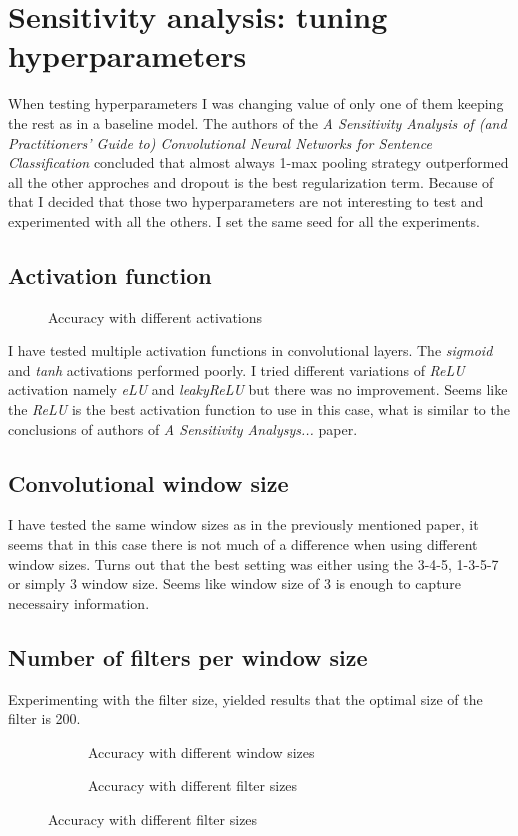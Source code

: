 \documentclass{article}
\begin{document}
\section{Sensitivity analysis: tuning hyperparameters}
When testing hyperparameters I was changing value of only one of them keeping
the rest as in a baseline model. The authors of the \textit{A Sensitivity Analysis of (and Practitioners’ Guide to) Convolutional
Neural Networks for Sentence Classification} concluded that almost always 1-max pooling strategy
outperformed all the other approches and dropout is the best regularization term. Because of that I decided
that those two hyperparameters are not interesting to test and experimented with all the others.
I set the same seed for all the experiments.


\subsection{Activation function}
\begin{figure}
    \begin{center}
        
    \end{center}
    \caption{Accuracy with different activations}
\end{figure}
I have tested multiple activation functions in convolutional layers. The \textit{sigmoid} and 
\textit{tanh} activations performed poorly. I tried different variations of \textit{ReLU} activation
namely \textit{eLU} and \textit{leakyReLU} but there was no improvement. Seems like the \textit{ReLU}
is the best activation function to use in this case, what is similar to the conclusions of authors of 
\textit{A Sensitivity Analysys...} paper.


\newpage
\subsection{Convolutional window size}
I have tested the same window sizes as in the previously mentioned paper,
it seems that in this case there is not much of a difference when using different
window sizes. Turns out that the best setting was either using the 3-4-5, 1-3-5-7 or simply 3 window size.
Seems like window size of 3 is enough to capture necessairy information.

\subsection{Number of filters per window size}
Experimenting with the filter size, yielded results that the optimal size of the filter is 200.
\begin{figure}[h]
    \begin{subfigure}{0.5\textwidth}
        \centering
        
        \caption{Accuracy with different window sizes}
    \end{subfigure}
    \begin{subfigure}{0.5\textwidth}
        \centering
        
        \caption{Accuracy with different filter sizes}
    \end{subfigure}
\end{figure}
\end{document}
